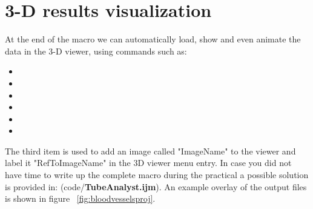 \section{3-D results visualization}
At the end of the macro we can automatically load, show and even animate the data in the 3-D viewer, using commands such as:

\begin{itemize}
\item {}
\item {}
\item {}
\item {}
\item {}
\item {}
\end{itemize}
The third item is used to add an image called "ImageName" to the viewer and label it "RefToImageName" in the 3D viewer  menu entry.
In case you did not have time to write up the complete macro during the practical a possible solution is provided in: (code/\textbf{TubeAnalyst.ijm}). An example overlay of the output files is shown in figure ~\ref{fig:bloodvesselsproj}.